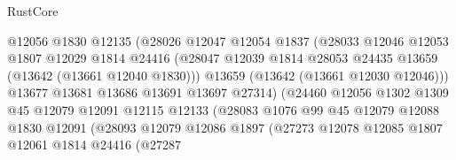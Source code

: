 \begin{lexlean}{RustCore}
\begin{coremodule}
                                  @12056
                                  @1830
                                  @12135
                                  (@28026
                                    @12047
                                    @12054
                                    @1837
                                    (@28033
                                      @12046
                                      @12053
                                      @1807
                                      @12029
                                      @1814
                                      @24416
                                      (@28047
                                        @12039
                                        @1814
                                        @28053
                                        @24435
                                        @13659
                                        (@13642 (@13661 @12040 @1830)))
                                      @13659
                                      (@13642 (@13661 @12030 @12046)))
                                    @13677
                                    @13681
                                    @13686
                                    @13691
                                    @13697
                                    @27314)
                                  (@24460
                                    @12056
                                    @1302
                                    @1309
                                    @45
                                    @12079
                                    @12091
                                    @12115
                                    @12133
                                    (@28083
                                      @1076
                                      @99
                                      @45
                                      @12079
                                      @12088
                                      @1830
                                      @12091
                                      (@28093
                                        @12079
                                        @12086
                                        @1897
                                        (@27273
                                          @12078
                                          @12085
                                          @1807
                                          @12061
                                          @1814
                                          @24416
                                          (@27287

\end{coremodule}
\end{lexlean}
